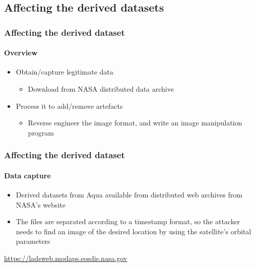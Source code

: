 \documentclass{beamer}
\begin{document}
\subsection{Affecting the derived datasets}

\begin{frame}
  \frametitle{Affecting the derived dataset}
  \framesubtitle{Overview}
  \begin{itemize}
    \item Obtain/capture legitimate data
    \begin{itemize}
      \item Download from NASA distributed data archive
    \end{itemize}

    \item Process it to add/remove artefacts
    \begin{itemize}
      \item Reverse engineer the image format, and write an image manipulation program
    \end{itemize}
  \end{itemize}
\end{frame}

\begin{frame}
  \frametitle{Affecting the derived dataset}
  \framesubtitle{Data capture}
  \begin{itemize}
    \item Derived datasets from Aqua available from distributed web archives from NASA's website
    \item The files are separated according to a timestamp format, so the attacker needs to find an image of the desired location by using the satellite's orbital parameters
  \end{itemize}
  
  \url{https://ladsweb.modaps.eosdis.nasa.gov}

\end{frame}
\end{document}
